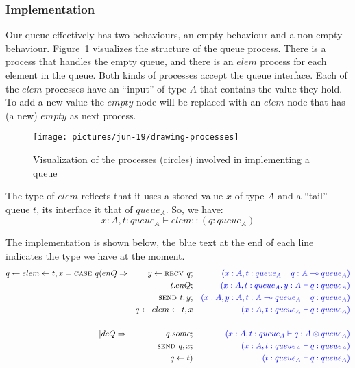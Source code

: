 \documentclass{article}
\begin{document}
	
	\subsubsection{Implementation}
	
	Our queue effectively has two behaviours, an empty-behaviour and a non-empty behaviour.
	Figure~\ref{fig:drawing-processes} visualizes the structure of the queue process. There is a process that handles the empty queue, 
	and there is an \(elem\) process for each element in the queue. Both kinds of processes accept the queue interface.
	Each of the \(elem\) processes have an ``input'' of type \(A\) that contains the value they hold. To add a new value the \(empty\) node will be replaced with an \(elem\) node that has (a new) \(empty\) as next process.
	
	\begin{figure}
		\centering
		\texttt{[image: pictures/jun-19/drawing-processes]}
		\caption{Visualization of the processes (circles) involved in implementing a queue}
		\label{fig:drawing-processes}
	\end{figure}
	
	
	The type of \(elem\) reflects that it uses a stored value \(x\) of type \(A\) and a ``tail'' queue \(t\), its interface it that of \(queue_A\). So, we have:
	\[ x:A, t:queue_A \vdash elem :: (q:queue_A) \]
	
	The implementation is shown below, the blue text at the end of each line indicates the type we have at the moment. 
	\begin{align*}
		q \leftarrow elem \leftarrow t,x = \textsc{case } q 
		&(enQ \Rightarrow 
		&y \leftarrow \textsc{recv } q; 
		&& {\color{blue} (x:A, t:queue_A \vdash q:A \multimap queue_A)}\\
		&                 &t.enQ;  
		&& {\color{blue}\qquad (x:A,t:queue_A,y:A\vdash q:queue_A)}\\
		&                 &\textsc{send }t,y;  
		&& {\color{blue}(x:A,y:A,t:A \multimap queue_A\vdash q:queue_A)}\\
		&                 & q \leftarrow elem \leftarrow t,x
		&& {\color{blue}(x:A,t:queue_A\vdash q:queue_A)}\\[1.5em]
		&| deQ \Rightarrow 
		& q.some; 
		&& {\color{blue} (x:A, t:queue_A \vdash q:A \otimes queue_A)}\\
		&& \textsc{send }q,x ; 
		&& {\color{blue} (x:A, t:queue_A \vdash q:queue_A)}\\
		&& q \leftarrow t)
		&& {\color{blue} (t:queue_A \vdash q:queue_A)}
		\end{align*}
		
\end{document}
